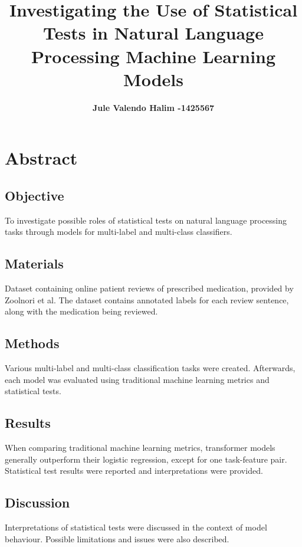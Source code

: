 \documentclass[10.7pt, onecolumn]{article}
\title{\vspace{-2em} Investigating the Use of Statistical Tests in Natural Language Processing Machine Learning Models}
\author[ ]{\bf\fontsize{13}{14}\selectfont Jule Valendo Halim -1425567\vspace{-.7em}}
\affil[ ]{\bf\fontsize{13}{14}\selectfont University of Melbourne}
\date{} %
\begin{document}
\maketitle
\vspace{-4em} %

\section{Abstract}\label{abstract}
\subsection{Objective}

To investigate possible roles of statistical tests on natural language processing tasks through models for multi-label and multi-class classifiers.
\subsection{Materials}

Dataset containing online patient reviews of prescribed medication, provided by Zoolnori et al\cite{psyTAR1}\cite{psyTar2}. The dataset contains annotated labels for each review sentence, along with the medication being reviewed.
\subsection{Methods}

Various multi-label and multi-class classification tasks were created. Afterwards, each model was evaluated using traditional machine learning metrics and statistical tests.

\subsection{Results}

When comparing traditional machine learning metrics, transformer models generally outperform their logistic regression, except for one task-feature pair. Statistical test results were reported and interpretations were provided.

\subsection{Discussion}

Interpretations of statistical tests were discussed in the context of model behaviour. Possible limitations and issues were also described.
\end{document}
